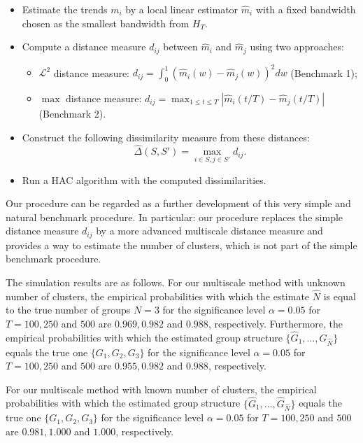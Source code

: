\documentclass[a4paper,12pt]{article}
\begin{document}
\begin{enumerate}[label=\arabic*.,leftmargin=0.6cm]
{\begin{itemize}[label=--,leftmargin=0.45cm,itemsep=0pt,topsep=0pt]
\item Estimate the trends $m_i$ by a local linear estimator $\hat{m}_i$ with a fixed bandwidth chosen as the smallest bandwidth from $H_T$.
\item Compute a distance measure $d_{ij}$ between $\hat{m}_i$ and $\hat{m}_j$ using two approaches:
\begin{itemize}[label=$\circ$]
\item $\mathcal{L}^2$ distance measure: $d_{ij} = \int_0^1 (\hat{m}_i(w) - \hat{m}_j(w))^2 dw$ (Benchmark 1);
\item $\max$ distance measure: $d_{ij} = \max_{1\leq t\leq T} |\hat{m}_i(t/T) - \hat{m}_j(t/T)|$ (Benchmark 2).
\end{itemize}
\item Construct the following dissimilarity measure from these distances:
\[ \hat{\Delta}(S,S') = \max_{i \in S,j \in S'} d_{ij}. \]
\item Run a HAC algorithm with the computed dissimilarities. 
\end{itemize}

Our procedure can be regarded as a further development of this very simple and natural benchmark procedure. In particular: our procedure replaces the simple distance measure $d_{ij}$ by a more advanced multiscale distance measure and provides a way to estimate the number of clusters, which is not part of the simple benchmark procedure.

The simulation results are as follows. For our multiscale method with unknown number of clusters, the empirical probabilities with which the estimate $\widehat{N}$ is equal to the true number of groups $N = 3$ for the significance level $\alpha=0.05$ for $T=100, 250$ and $500$ are $0.969, 0.982$ and $0.988$, respectively. Furthermore, the empirical probabilities with which the estimated group structure $\{ \widehat{G}_1,\ldots,\widehat{G}_{\widehat{N}}\}$ equals the true one $\{G_1,G_2,G_3\}$ for the significance level $\alpha=0.05$ for $T=100, 250$ and $500$ are $0.955, 0.982$ and $0.988$, respectively.

For our multiscale method with known number of clusters, the empirical probabilities with which the estimated group structure $\{ \widehat{G}_1,\ldots,\widehat{G}_{\widehat{N}}\}$ equals the true one $\{G_1,G_2,G_3\}$ for the significance level $\alpha=0.05$ for $T=100, 250$ and $500$ are $0.981, 1.000$ and $1.000$, respectively.

}
\end{enumerate}
\end{document}
